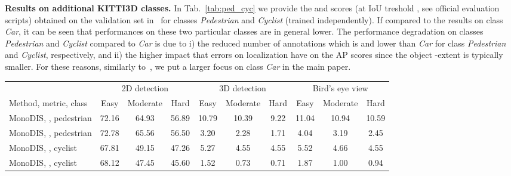 \documentclass[10pt,twocolumn,letterpaper]{article}
\newcommand{\monodis}{MonoDIS}
\renewcommand{\paragraph}[1]{

        \vspace{3pt}
	\noindent\textbf{#1}}
\begin{document}
\paragraph{Results on additional KITTI3D classes.}
In Tab.~\ref{tab:ped_cyc} we provide the  and  scores (at IoU treshold , see official evaluation scripts) obtained on the validation set in~\cite{NIPS2015_Chen} for classes \textit{Pedestrian} and \textit{Cyclist} (trained independently). If compared to the results on class \textit{Car}, it can be seen that performances on these two particular classes are in general lower. The performance degradation on classes \textit{Pedestrian} and \textit{Cyclist} compared to \textit{Car} is due to i) the reduced number of annotations which is  and  lower than \emph{Car} for class \textit{Pedestrian} and \textit{Cyclist}, respectively, and ii) the higher impact that errors on localization have on the AP scores since the object -extent is typically smaller. For these reasons, similarly to~\cite{Manhardt_2019_CVPR,qin2019monogrnet,Roddick18,Xu_2018_CVPR}, we put a larger focus on class \textit{Car} in the main paper. 
\begin{table*}[ht]
    \centering
    {\footnotesize
    \begin{tabular}{l|ccc|ccc|ccc}
        \toprule
        & \multicolumn{3}{c|}{2D detection} & \multicolumn{3}{c|}{3D detection} & \multicolumn{3}{c}{Bird's eye view} \\
        Method, metric, class & Easy & Moderate & Hard & Easy & Moderate & Hard & Easy & Moderate & Hard \\
        \midrule
	\monodis{}, , pedestrian & 72.16 & 64.93 & 56.89 & 10.79 & 10.39 & 9.22 & 11.04 & 10.94 & 10.59 \\
	\monodis{}, , pedestrian & 72.78 & 65.56 & 56.50 & 3.20 & 2.28 & 1.71 & 4.04 & 3.19 & 2.45 \\
        \midrule
	\monodis{}, , cyclist & 67.81 & 49.15 & 47.26 & 5.27 & 4.55 & 4.55 & 5.52 & 4.66 & 4.55 \\
	\monodis{}, , cyclist & 68.12 & 47.45 & 45.60 & 1.52 & 0.73 & 0.71 & 1.87 & 1.00 & 0.94 \\
        \bottomrule
    \end{tabular}}
    \caption{Results on the classes \textit{Pedestrian} and \textit{Cyclist} on the KITTI3D validation set (0.5 IoU threshold).}
    \label{tab:ped_cyc}
    \vspace{-12pt}
\end{table*}
\end{document}
